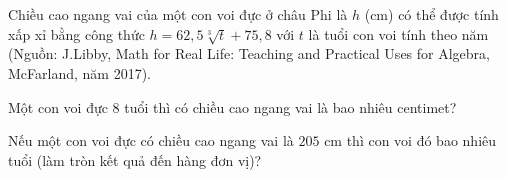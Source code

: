 \begin{vd}
	Chiều cao ngang vai của một con voi đực ở châu Phi là $h$ (cm) có thể được tính xấp xỉ bằng công thức $h=62,5\sqrt[3]{t}+75,8$ với $t$ là tuổi con voi tính theo năm (Nguồn: J.Libby, Math for Real Life: Teaching and Practical Uses for Algebra, McFarland, năm 2017).
	\begin{listEX}[1]
	\item Một con voi đực $8$ tuổi thì có chiều cao ngang vai là bao nhiêu centimet?
	\item Nếu một con voi đực có chiều cao ngang vai là $205$ cm thì con voi đó bao nhiêu tuổi (làm tròn kết quả đến hàng đơn vị)?
	\end{listEX}
\end{vd}
